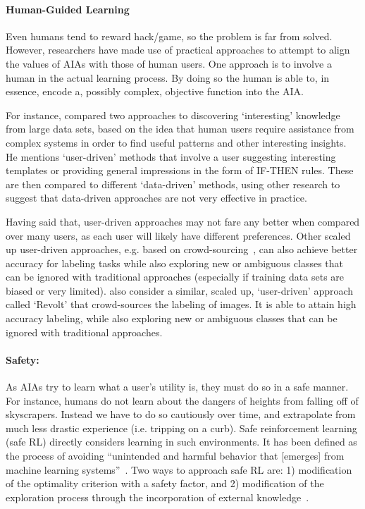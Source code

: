 \paragraph{Human-Guided Learning}
Even humans tend to reward hack/game, so the problem is far from solved. However, researchers have made use of practical approaches to attempt to align the values of AIAs with those of human users. One approach is to involve a human in the actual learning process. By doing so the human is able to, in essence, encode a, possibly complex, objective function into the AIA.

For instance, \citet{Freitas2006-qo} compared two approaches to discovering `interesting' knowledge from large data sets, based on the idea that human users require assistance from complex systems in order to find useful patterns and other interesting insights. He mentions `user-driven' methods that involve a user suggesting interesting templates or providing general impressions in the form of IF-THEN rules. These are then compared to different `data-driven' methods, using other research to suggest that data-driven approaches are not very effective in practice.

Having said that, user-driven approaches may not fare any better when compared over many users, as each user will likely have different preferences. Other scaled up user-driven approaches, e.g. based on crowd-sourcing~\citet{Chang2017-kl}, can also achieve better accuracy for labeling tasks while also exploring new or ambiguous classes that can be ignored with traditional approaches (especially if training data sets are biased or very limited). \citet{Chang2017-kl} also consider a similar, scaled up, `user-driven' approach called `Revolt' that crowd-sources the labeling of images. It is able to attain high accuracy labeling, while also exploring new or ambiguous classes that can be ignored with traditional approaches.

\paragraph{Safety:}
As AIAs try to learn what a user's utility is, they must do so in a safe manner. For instance, humans do not learn about the dangers of heights from falling off of skyscrapers. Instead we have to do so cautiously over time, and extrapolate from much less drastic experience (i.e. tripping on a curb). Safe reinforcement learning (safe RL) directly considers learning in such environments. It has been defined as the process of avoiding ``unintended and harmful behavior that [emerges] from machine learning systems''~\cite{Amodei2016-xi}. Two ways to approach safe RL are: 1) modification of the optimality criterion with a safety factor, and 2) modification of the exploration process through the incorporation of external knowledge~\cite{Garcia2015-rs}.

